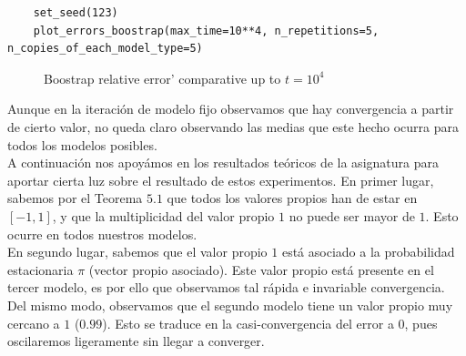\documentclass[a4paper]{article}
\begin{document}
\begin{verbatim}
	set_seed(123)
	plot_errors_boostrap(max_time=10**4, n_repetitions=5, n_copies_of_each_model_type=5)
\end{verbatim}

\begin{figure}[H]
	\centering
	\caption{Boostrap relative error' comparative up to $t=10^4$}
\end{figure}

Aunque en la iteración de modelo fijo observamos que hay convergencia a partir de cierto valor, no queda claro observando las medias que este hecho ocurra para todos los modelos posibles. \\

A continuación nos apoyámos en los resultados teóricos de la asignatura para aportar cierta luz sobre el resultado de estos experimentos. En primer lugar, sabemos por el Teorema $5.1$ que todos los valores propios han de estar en $[-1, 1]$, y que la multiplicidad del valor propio $1$ no puede ser mayor de $1$. Esto ocurre en todos nuestros modelos. \\

En segundo lugar, sabemos que el valor propio $1$ está asociado a la probabilidad estacionaria $\pi$ (vector propio asociado). Este valor propio está presente en el tercer modelo, es por ello que observamos tal rápida e invariable convergencia. \\

Del mismo modo, observamos que el segundo modelo tiene un valor propio muy cercano a $1$ ($0.99$). Esto se traduce en la casi-convergencia del error a $0$, pues oscilaremos ligeramente sin llegar a converger. \\
\end{document}
